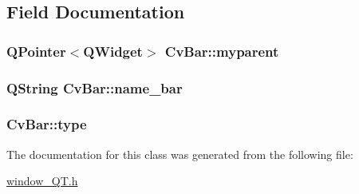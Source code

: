 \subsection{Field Documentation}
\hypertarget{classCvBar_af6fa35b8c9f4aed557854fc3aa80a040}{
\subsubsection[{myparent}]{\setlength{\rightskip}{0pt plus 5cm}QPointer$<$QWidget$>$ {\bf CvBar::myparent}}}
\label{classCvBar_af6fa35b8c9f4aed557854fc3aa80a040}
\hypertarget{classCvBar_a6970f0eae76786143e2df415681d0a6f}{
\subsubsection[{name\_\-bar}]{\setlength{\rightskip}{0pt plus 5cm}QString {\bf CvBar::name\_\-bar}}}
\label{classCvBar_a6970f0eae76786143e2df415681d0a6f}
\hypertarget{classCvBar_a64329aa3255c2c98a36f3f887a939b40}{
\subsubsection[{type}]{ {\bf CvBar::type}}}
\label{classCvBar_a64329aa3255c2c98a36f3f887a939b40}


The documentation for this class was generated from the following file:\begin{DoxyCompactItemize}
\item 
\hyperlink{window__QT_8h}{window\_\-QT.h}\end{DoxyCompactItemize}
